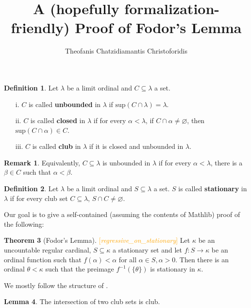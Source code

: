 \documentclass[11pt]{article}
\title{A (hopefully formalization-friendly) Proof of Fodor's Lemma}
\author{Theofanis Chatzidiamantis Christoforidis}
\date{}
\theoremstyle{definition}
\newtheorem{defin}{Definition}
\newtheorem{lem}[defin]{Lemma}
\newtheorem{thm}[defin]{Theorem}
\newtheorem{rem}{Remark}[defin]
\newcommand{\sup}{\text{sup}}
\begin{document}
\maketitle

\begin{defin}
    Let $\lambda$ be a limit ordinal and $C\subseteq \lambda$ a set.
    \begin{enumerate} \itemsep0.2em
        \item[i.]  $C$ is called \textbf{unbounded} in $\lambda$ if $\sup (C\cap \lambda)=\lambda$.
        \item[ii.] $C$ is called \textbf{closed} in $\lambda$ if for every $\alpha < \lambda$,
        if $C\cap\alpha\neq\varnothing$, then $\sup (C\cap\alpha)\in C$.
        \item[iii.] $C$ is called \textbf{club} in $\lambda$ if it is closed and unbounded
        in $\lambda$.
    \end{enumerate}
\end{defin}

\begin{rem}
    Equivalently, $C\subseteq\lambda$ is unbounded in $\lambda$ if for every $\alpha < \lambda$,
        there is a $\beta\in C$ such that $\alpha<\beta$.
\end{rem}

\begin{defin}
    Let $\lambda$ be a limit ordinal and $S\subseteq \lambda$ a set. $S$ is called
    \textbf{stationary} in $\lambda$ if for every club set $C\subseteq\lambda$,
    $S\cap C\neq\varnothing$.
\end{defin}

Our goal is to give a self-contained (assuming the contents of Mathlib) proof of the following:
\begin{thm}[Fodor's Lemma] \textcolor{orange}{[\textit{regressive\_on\_stationary}]}
   \newline Let $\kappa$ be an uncountable regular cardinal, $S\subseteq\kappa$ a
   stationary set and let $f:S\rightarrow \kappa$ be an ordinal function such
   that $f(\alpha)<\alpha$ for all $\alpha\in S, \alpha>0$. Then there is an ordinal
   $\theta <\kappa$ such that the preimage $f^{-1}(\{\theta\})$ is stationary in $\kappa$.
\end{thm}

We mostly follow the structure of \cite[Chapter 8]{Jech03}.

\begin{lem}
    The intersection of two club sets is club.
\end{lem}
\end{document}
